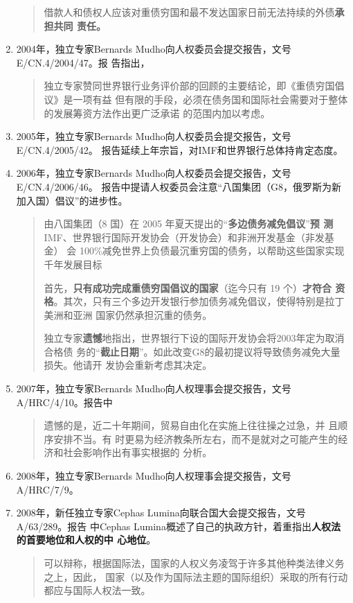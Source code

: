 \begin{enumerate}
\begin{quotation}
    借款人和债权人应该对重债穷国和最不发达国家日前无法持续的外债\textbf{承担共同
      责任。}
  \end{quotation}

\item 2004年，独立专家Bernards Mudho向人权委员会提交报告，文号E/CN.4/2004/47。报
  告指出，
  \begin{quotation}
    独立专家赞同世界银行业务评价部的回顾的主要结论，即《重债穷国倡议》是一项有益
    但有限的手段，必须在债务国和国际社会需要对于整体的发展筹资方法作出更广泛承诺
    的范围内加以考虑。
  \end{quotation}

\item 2005年，独立专家Bernards Mudho向人权委员会提交报告，文号E/CN.4/2005/42。
  报告延续上年宗旨，对IMF和世界银行总体持肯定态度。

\item 2006年，独立专家Bernards Mudho向人权委员会提交报告，文号E/CN.4/2006/46。
  报告中提请人权委员会注意“八国集团（G8，俄罗斯为新加入国）倡议”的进步性。
  \begin{quotation}
    由八国集团（8 国）在 2005 年夏天提出的``\textbf{多边债务减免倡议}''\textbf{预
      测}IMF、世界银行国际开发协会（开发协会）和非洲开发基金（非发基金）
    会 100\%减免世界上负债最沉重穷国的债务，以帮助这些国家实现千年发展目标

    首先，\textbf{只有成功完成重债穷国倡议的国家}（迄今只有 19 个）\textbf{才符合
      资格}。其次，只有三个多边开发银行参加债务减免倡议，使得特别是拉丁美洲和亚洲
    国家仍然承担沉重的债务。

    独立专家\textbf{遗憾}地指出，世界银行下设的国际开发协会将2003年定为取消合格债
    务的“\textbf{截止日期}”。如此改变G8的最初提议将导致债务减免大量损失。他请开
    发协会重新考虑其决定。
  \end{quotation}

\item 2007年，独立专家Bernards Mudho向人权理事会提交报告，文号A/HRC/4/10。报告中
  \begin{quotation}
    遗憾的是，近二十年期间，贸易自由化在实施上往往操之过急，并 且顺序安排不当。有
    时更易为经济教条所左右，而不是就对之可能产生的经济和社会影响作出有事实根据的
    分析。
  \end{quotation}

\item 2008年，独立专家Bernards Mudho向人权理事会提交报告，文号A/HRC/7/9。

\item 2008年，新任独立专家Cephas Lumina向联合国大会提交报告，文号A/63/289。报告
  中Cephas Lumina概述了自己的执政方针，着重指出\textbf{人权法的首要地位和人权的中
    心地位}。
  \begin{quotation}
    可以辩称，根据国际法，国家的人权义务凌驾于许多其他种类法律义务之上，因此，
    国家（以及作为国际法主题的国际组织）采取的所有行动都应与国际人权法一致。
  \end{quotation}


\end{enumerate}
